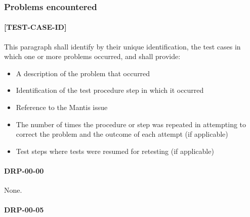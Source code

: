 \documentclass[DM,lsstdraft,STR,toc]{lsstdoc}
\begin{document}
\subsubsection{Problems encountered}
\paragraph{[TEST-CASE-ID]}
This paragraph shall identify by their unique identification, the test cases in which one or more problems occurred, and shall provide:
\begin{itemize}
\item A description of the problem that occurred
\item Identification of the test procedure step in which it occurred
\item Reference to the Mantis issue
\item The number of times the procedure or step was repeated in attempting to correct the problem and the outcome of each attempt (if applicable)
\item Test steps where tests were resumed for retesting (if applicable)
\end{itemize}

\paragraph{DRP-00-00}

None.

\paragraph{DRP-00-05}
\label{sect:problems-drp-00-05}
\end{document}
